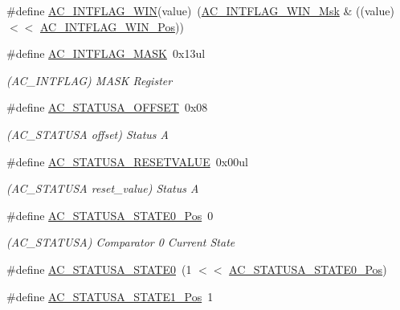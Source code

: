 \begin{DoxyCompactItemize}
\item 
\#define \mbox{\hyperlink{group___s_a_m_d21___a_c_gac21318f4582f8935a049ae81f0676e75}{A\+C\+\_\+\+I\+N\+T\+F\+L\+A\+G\+\_\+\+W\+IN}}(value)~(\mbox{\hyperlink{group___s_a_m_d21___a_c_gaffd6b3fa5bd9b71b4ccce3fb652b5539}{A\+C\+\_\+\+I\+N\+T\+F\+L\+A\+G\+\_\+\+W\+I\+N\+\_\+\+Msk}} \& ((value) $<$$<$ \mbox{\hyperlink{group___s_a_m_d21___a_c_gab8feb07a41c8519472bce0d6b09d568d}{A\+C\+\_\+\+I\+N\+T\+F\+L\+A\+G\+\_\+\+W\+I\+N\+\_\+\+Pos}}))
\item 
\#define \mbox{\hyperlink{group___s_a_m_d21___a_c_ga3b147673fba8c46ce42c8825d397964b}{A\+C\+\_\+\+I\+N\+T\+F\+L\+A\+G\+\_\+\+M\+A\+SK}}~0x13ul
\begin{DoxyCompactList}\small\item\em (A\+C\+\_\+\+I\+N\+T\+F\+L\+AG) M\+A\+SK Register \end{DoxyCompactList}\item 
\#define \mbox{\hyperlink{group___s_a_m_d21___a_c_ga7357f0e4cff320ccdcfce8cfa4446590}{A\+C\+\_\+\+S\+T\+A\+T\+U\+S\+A\+\_\+\+O\+F\+F\+S\+ET}}~0x08
\begin{DoxyCompactList}\small\item\em (A\+C\+\_\+\+S\+T\+A\+T\+U\+SA offset) Status A \end{DoxyCompactList}\item 
\#define \mbox{\hyperlink{group___s_a_m_d21___a_c_ga1d0c5a8f06130ee70400f50068aa162a}{A\+C\+\_\+\+S\+T\+A\+T\+U\+S\+A\+\_\+\+R\+E\+S\+E\+T\+V\+A\+L\+UE}}~0x00ul
\begin{DoxyCompactList}\small\item\em (A\+C\+\_\+\+S\+T\+A\+T\+U\+SA reset\+\_\+value) Status A \end{DoxyCompactList}\item 
\#define \mbox{\hyperlink{group___s_a_m_d21___a_c_gae23aae3cd17aca60cfa3046da6f432c0}{A\+C\+\_\+\+S\+T\+A\+T\+U\+S\+A\+\_\+\+S\+T\+A\+T\+E0\+\_\+\+Pos}}~0
\begin{DoxyCompactList}\small\item\em (A\+C\+\_\+\+S\+T\+A\+T\+U\+SA) Comparator 0 Current State \end{DoxyCompactList}\item 
\#define \mbox{\hyperlink{group___s_a_m_d21___a_c_ga0dc118c4e91a1b7265e26d879c499f0c}{A\+C\+\_\+\+S\+T\+A\+T\+U\+S\+A\+\_\+\+S\+T\+A\+T\+E0}}~(1 $<$$<$ \mbox{\hyperlink{group___s_a_m_d21___a_c_gae23aae3cd17aca60cfa3046da6f432c0}{A\+C\+\_\+\+S\+T\+A\+T\+U\+S\+A\+\_\+\+S\+T\+A\+T\+E0\+\_\+\+Pos}})
\item 
\#define \mbox{\hyperlink{group___s_a_m_d21___a_c_gaa15668b5c57b09a6b65cab3c19bef8e5}{A\+C\+\_\+\+S\+T\+A\+T\+U\+S\+A\+\_\+\+S\+T\+A\+T\+E1\+\_\+\+Pos}}~1

\end{DoxyCompactItemize}
